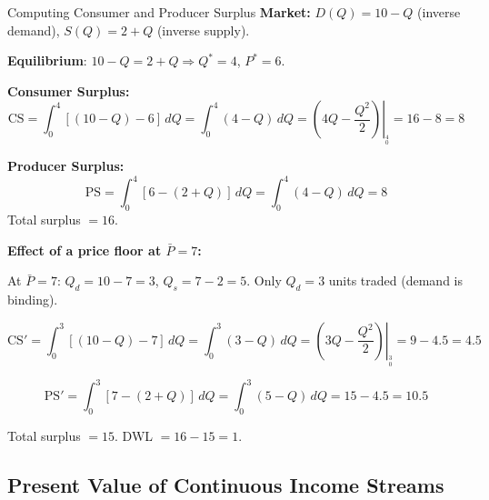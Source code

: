 \documentclass[12pt, a4paper]{article}
\theoremstyle{definition}
\newcommand{\dd}[1]{\,d#1}
\newcommand{\eval}[2]{\left.#1\right|_{#2}}
\newcommand{\CS}{\text{CS}}
\newcommand{\PS}{\text{PS}}
\begin{document}
\begin{exbox}{Computing Consumer and Producer Surplus}
\textbf{Market:} $D(Q) = 10 - Q$ (inverse demand), $S(Q) = 2 + Q$
(inverse supply).

\textbf{Equilibrium}: $10-Q = 2+Q \Rightarrow Q^*=4$, $P^*=6$.

\textbf{Consumer Surplus:}
\[
  \CS = \int_0^4[(10-Q)-6]\dd{Q}
      = \int_0^4(4-Q)\dd{Q}
      = \eval{\left(4Q-\frac{Q^2}{2}\right)}{_0^4}
      = 16-8 = 8
\]

\textbf{Producer Surplus:}
\[
  \PS = \int_0^4[6-(2+Q)]\dd{Q}
      = \int_0^4(4-Q)\dd{Q}
      = 8
\]
Total surplus $= 16$.

\textbf{Effect of a price floor at $\bar P = 7$:}

At $\bar P=7$: $Q_d = 10-7 = 3$, $Q_s = 7-2 = 5$. Only $Q_d=3$ units
traded (demand is binding).

\[
  \CS' = \int_0^3[(10-Q)-7]\dd{Q} = \int_0^3(3-Q)\dd{Q}
       = \eval{\left(3Q-\frac{Q^2}{2}\right)}{_0^3} = 9-4.5 = 4.5
\]

\[
  \PS' = \int_0^3[7-(2+Q)]\dd{Q} = \int_0^3(5-Q)\dd{Q}
       = 15-4.5 = 10.5
\]

Total surplus $= 15$. DWL $= 16-15 = 1$.
\end{exbox}

\subsection{Present Value of Continuous Income Streams}
\end{document}
